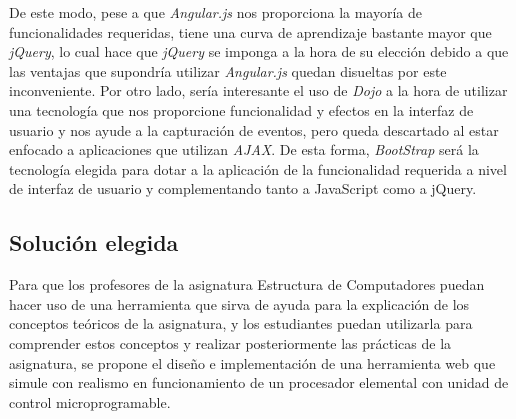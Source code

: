 \begin{table}[htbp]
\centering
\caption{Comparación de frameworks y bibliotecas.}
\label{tab:comparison_webframeworks}
\end{table}

De este modo,  pese a que \textit{Angular.js} nos proporciona la mayoría de funcionalidades requeridas, tiene una curva de aprendizaje bastante mayor que \textit{jQuery}, lo cual hace que \textit{jQuery} se imponga a la hora de su elección debido a que las ventajas que supondría utilizar \textit{Angular.js} quedan disueltas por este inconveniente. Por otro lado, sería interesante el uso de \textit{Dojo} a la hora de utilizar una tecnología que nos proporcione funcionalidad y efectos en la interfaz de usuario y nos ayude a la capturación de eventos, pero queda descartado al estar enfocado a aplicaciones que utilizan \textit{AJAX}. De esta forma, \textit{BootStrap} será la tecnología elegida para dotar a la aplicación de la funcionalidad requerida a nivel de interfaz de usuario y complementando tanto a JavaScript como a jQuery.

\subsection{Solución elegida}
\label{sec:solution_selection}

Para que los profesores de la asignatura Estructura de Computadores puedan hacer uso de una herramienta que sirva de ayuda para la explicación de los conceptos teóricos de la asignatura, y los estudiantes puedan utilizarla para comprender estos conceptos y realizar posteriormente las prácticas de la asignatura, se propone el diseño e implementación de una herramienta web que simule con realismo en funcionamiento de un procesador elemental con unidad de control microprogramable.

